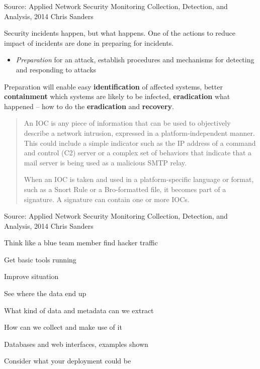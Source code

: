 \documentclass[Screen16to9,17pt]{foils}
\begin{document}
Source: Applied Network Security Monitoring Collection, Detection, and Analysis, 2014 Chris Sanders




Security incidents happen, but what happens. One of the actions to reduce impact of incidents are done in preparing for incidents.

\begin{itemize}
\item \emph{Preparation} for an attack, establish procedures and mechanisms for detecting and responding to attacks
\end{itemize}

Preparation will enable easy {\bf identification} of affected systems, better {\bf containment} which systems are likely to be infected, {\bf eradication} what happened -- how to do the {\bf eradication} and {\bf recovery}.




\begin{quote}
An IOC is any piece of information that can be used to objectively describe a
network intrusion, expressed in a platform-independent manner. This could include a simple indicator such as the IP address of a command and control (C2) server or a complex set of behaviors that indicate that a mail server is being used as a malicious SMTP relay.

When an IOC is taken and used in a platform-specific language or format, such as a Snort Rule or a Bro-formatted file, it becomes part of a signature. A signature can contain one or more IOCs.
\end{quote}

Source: Applied Network Security Monitoring Collection, Detection, and Analysis, 2014 Chris Sanders




\begin{list1}
\item Think like a blue team member find hacker traffic
\item Get basic tools running
\item Improve situation
\begin{list2}
\item See where the data end up
\item What kind of data and metadata can we extract
\item How can we collect and make use of it
\item Databases and web interfaces, examples shown
\item Consider what your deployment could be
\end{list2}
\end{list1}
\end{document}
